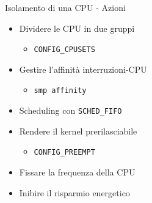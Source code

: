 \begin{frame}{Isolamento di una CPU - Azioni}
	\begin{itemize}
		\item Dividere le CPU in due gruppi
		\begin{itemize}
			\item \texttt{CONFIG\_CPUSETS}
		\end{itemize}
		\item Gestire l'affinità interruzioni-CPU 
		\begin{itemize}
			\item \texttt{smp affinity}
		\end{itemize}
		\item Scheduling con \texttt{SCHED\_FIFO}
		\item Rendere il kernel prerilasciabile 
		\begin{itemize}
			\item \texttt{CONFIG\_PREEMPT}
		\end{itemize}
		\item Fissare la frequenza della CPU
		\item Inibire il risparmio energetico
	\end{itemize}
\end{frame}